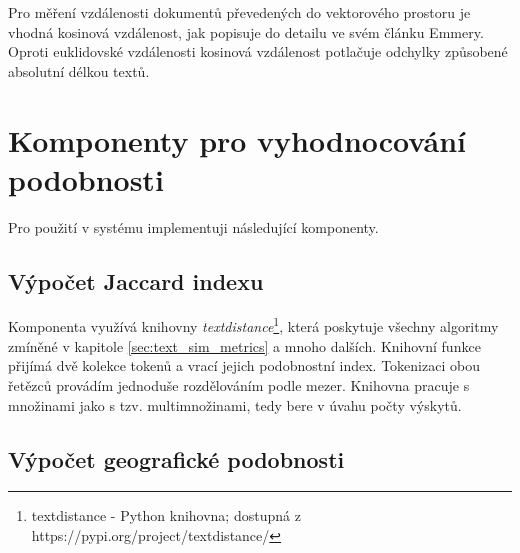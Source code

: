 \documentclass[thesis=M,czech]{FITthesis}[2019/12/23]
\begin{document}
Pro měření vzdálenosti dokumentů převedených do vektorového prostoru je vhodná kosinová vzdálenost, jak popisuje do detailu ve svém článku\cite{emmery2017} Emmery. Oproti euklidovské vzdálenosti kosinová vzdálenost potlačuje odchylky způsobené absolutní délkou textů.

\section{Komponenty pro vyhodnocování podobnosti}

Pro použití v systému implementuji následující komponenty.

\subsection{Výpočet Jaccard indexu}
\label{sec:component_jaccard_index}

Komponenta využívá knihovny \textit{textdistance}\footnote{textdistance - Python knihovna; dostupná z https://pypi.org/project/textdistance/}, která poskytuje všechny algoritmy zmíněné v kapitole \ref{sec:text_sim_metrics} a mnoho dalších. Knihovní funkce přijímá dvě kolekce tokenů a vrací jejich podobnostní index. Tokenizaci obou řetězců provádím jednoduše rozdělováním podle mezer. Knihovna pracuje s množinami jako s tzv. multimnožinami, tedy bere v úvahu počty výskytů.
    
\subsection{Výpočet geografické podobnosti}
\label{sec:component_geospatial_similarity}
    
\end{document}
